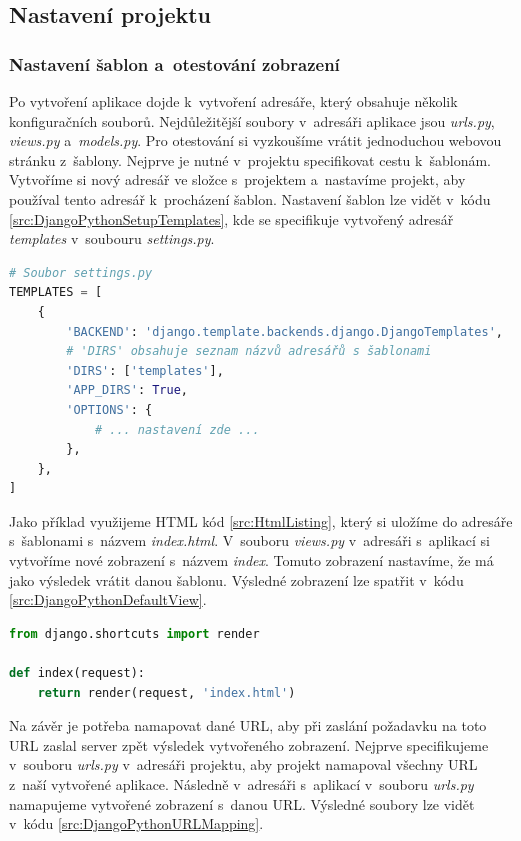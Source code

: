 \subsection{Nastavení projektu}

\subsubsection*{Nastavení šablon a~otestování zobrazení}

Po vytvoření aplikace dojde k~vytvoření adresáře, který obsahuje několik konfiguračních souborů. Nejdůležitější soubory v~adresáři aplikace jsou \emph{urls.py}, \emph{views.py} a~\emph{models.py}. Pro otestování si vyzkoušíme vrátit jednoduchou webovou stránku z~šablony. Nejprve je nutné v~projektu specifikovat cestu k~šablonám. Vytvoříme si nový adresář ve složce s~projektem a~nastavíme projekt, aby používal tento adresář k~procházení šablon. Nastavení šablon lze vidět v~kódu \ref{src:DjangoPythonSetupTemplates}, kde se specifikuje vytvořený adresář \emph{templates} v~soubouru \emph{settings.py}.

\begin{lstlisting}[language=Python,label=src:DjangoPythonSetupTemplates,caption={Nastavení šablon v Django projektu \cite{django-online-dokumentace}}]
# Soubor settings.py
TEMPLATES = [
    {
        'BACKEND': 'django.template.backends.django.DjangoTemplates',
        # 'DIRS' obsahuje seznam názvů adresářů s šablonami
        'DIRS': ['templates'],
        'APP_DIRS': True,
        'OPTIONS': {
            # ... nastavení zde ...
        },
    },
]
\end{lstlisting}

Jako příklad využijeme HTML kód \ref{src:HtmlListing}, který si uložíme do adresáře s~šablonami s~názvem \emph{index.html}. V~souboru \emph{views.py} v~adresáři s~aplikací si vytvoříme nové zobrazení s~názvem \emph{index}. Tomuto zobrazení nastavíme, že má jako výsledek vrátit danou šablonu. Výsledné zobrazení lze spatřit v~kódu \ref{src:DjangoPythonDefaultView}.

\begin{lstlisting}[language=Python,label=src:DjangoPythonDefaultView,caption={Přikladné zobrazení v Djangu s~využitím šablony}]
from django.shortcuts import render

def index(request):
    return render(request, 'index.html')
\end{lstlisting}

Na závěr je potřeba namapovat dané URL, aby při zaslání požadavku na toto URL zaslal server zpět výsledek vytvořeného zobrazení. Nejprve specifikujeme v~souboru \emph{urls.py} v~adresáři projektu, aby projekt namapoval všechny URL z~naší vytvořené aplikace. Následně v~adresáři s~aplikací v~souboru \emph{urls.py} namapujeme vytvořené zobrazení s~danou URL. Výsledné soubory lze vidět v~kódu \ref{src:DjangoPythonURLMapping}.

